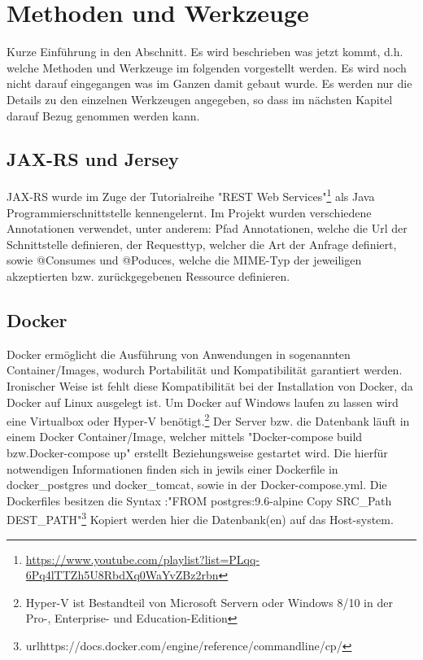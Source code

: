 \documentclass[fleqn,10pt,ngerman]{SelfArx}
\begin{document}
	
	
	
	
	
	
	\newpage
	\section{Methoden und Werkzeuge}
	\label{sec:methoden}
	
	Kurze Einführung in den Abschnitt. Es wird beschrieben was jetzt kommt, d.h. welche Methoden und Werkzeuge im folgenden vorgestellt werden. 
	Es wird noch nicht darauf eingegangen was im Ganzen damit gebaut wurde. Es werden nur die Details zu den einzelnen Werkzeugen angegeben, so dass im nächsten Kapitel darauf Bezug genommen werden kann. 
	
	
	\subsection{JAX-RS und Jersey}
	JAX-RS wurde im Zuge der Tutorialreihe "REST Web Services"\footnote{\url{https://www.youtube.com/playlist?list=PLqq-6Pq4lTTZh5U8RbdXq0WaYvZBz2rbn}} als Java Programmierschnittstelle kennengelernt.
	Im Projekt wurden verschiedene Annotationen verwendet, unter anderem:\newline
	Pfad Annotationen, welche die Url der Schnittstelle definieren, der Requesttyp, welcher die Art der Anfrage definiert, sowie @Consumes und @Poduces, welche die MIME-Typ der jeweiligen akzeptierten bzw. zurückgegebenen Ressource definieren.
 
	
	\subsection{Docker}
	Docker ermöglicht die Ausführung von Anwendungen in sogenannten Container/Images, wodurch Portabilität und Kompatibilität garantiert werden. Ironischer Weise ist fehlt diese Kompatibilität bei der Installation von Docker, da  Docker auf Linux ausgelegt ist. Um Docker auf Windows laufen zu lassen wird eine Virtualbox oder Hyper-V benötigt.\footnote{Hyper-V ist Bestandteil von Microsoft Servern oder Windows 8/10 in der Pro-, Enterprise- und Education-Edition  } 
	Der Server bzw. die Datenbank läuft in einem Docker Container/Image, welcher mittels "Docker-compose build bzw.Docker-compose up" erstellt Beziehungsweise gestartet wird.
	Die hierfür notwendigen Informationen finden sich in jewils einer Dockerfile in docker\_postgres und docker\_tomcat, sowie in der Docker-compose.yml.
	Die Dockerfiles besitzen die Syntax :\newline "FROM postgres:9.6-alpine\newline 
	Copy SRC\_Path DEST\_PATH"\footnote{url{https://docs.docker.com/engine/reference/commandline/cp/}}
	Kopiert werden hier die Datenbank(en) auf das Host-system.
	
\end{document}
